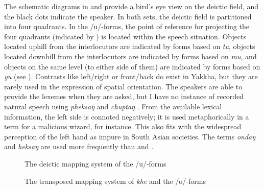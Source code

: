 The schematic diagrams in  and  provide a bird's eye view on the deictic field, and the black dots indicate the speaker. In both sets, the deictic field is partitioned into four quadrants. In the /u/-forms, the point of reference  for projecting the four quadrants (indicated by ) is located within the speech situation. Objects located uphill from the interlocutors are indicated by forms based on \emph{tu}, objects located downhill  from the interlocutors are indicated by forms based on  \emph{mu}, and objects on the same level (to either side of them) are indicated by forms based on \emph{yu} (see ). Contrasts like left/right or front/back do exist in Yakkha, but they are rarely used in the expression of spatial orientation. The speakers are able to provide the lexemes when they are asked, but I have no instance of recorded natural speech using \emph{pheksaŋ}  and \emph{chuptaŋ} . From the available lexical information, the left side is connoted negatively; it is used metaphorically in a term for a malicious wizard, for instance. This also  fits with the widespread perception of the left hand as impure in South Asian societies. The terms \emph{ondaŋ}  and \emph{heksaŋ}  are used more frequently than  and . 


\begin{figure}
\centering
\setlength{\fboxsep}{0pt}
\caption{The deictic mapping system of the /u/-forms}\label{deicticschema-1}
\end{figure}

\bigskip

\begin{figure}
\centering
\setlength{\fboxsep}{0pt}
\caption{The transposed mapping system of  \emph{khe} and the /o/-forms}\label{deicticschema-2}
\end{figure}

